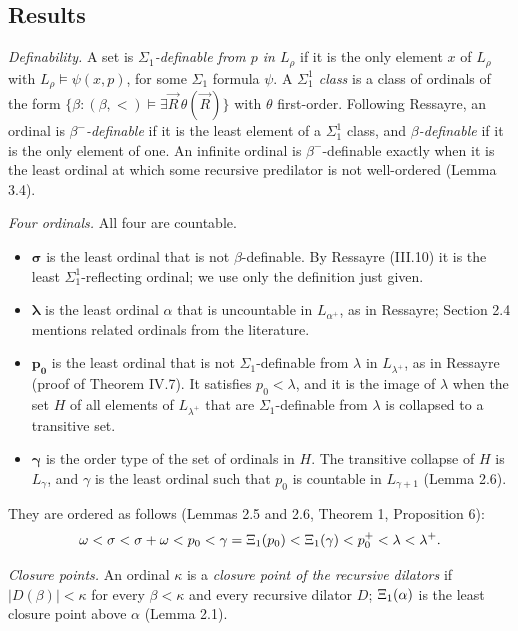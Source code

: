 \documentclass[11pt]{article}
\begin{document}
\subsection{Results}

\emph{Definability.} A set is \emph{$\Sigma_1$-definable from $p$ in $L_{\rho}$} if it is the only element $x$ of
$L_{\rho}$ with $L_{\rho} \models \psi(x, p)$, for some $\Sigma_1$ formula $\psi$. A \emph{$\Sigma^1_1$ class} is a
class of ordinals of the form $\{\beta : (\beta, <) \models \exists \vec R\, \theta(\vec R)\}$ with $\theta$
first-order. Following Ressayre, an ordinal is \emph{$\beta^-$-definable} if it is the least element of a
$\Sigma^1_1$ class, and \emph{$\beta$-definable} if it is the only element of one. An infinite ordinal is
$\beta^-$-definable exactly when it is the least ordinal at which some recursive predilator is not well-ordered
(Lemma 3.4).

\emph{Four ordinals.} All four are countable.
\begin{itemize}
\item $\boldsymbol{\sigma}$ is the least ordinal that is not $\beta$-definable. By Ressayre (III.10) it is the least
  $\Sigma^1_1$-reflecting ordinal; we use only the definition just given.
\item $\boldsymbol{\lambda}$ is the least ordinal $\alpha$ that is uncountable in $L_{\alpha^+}$, as in Ressayre;
  Section 2.4 mentions related ordinals from the literature.
\item $\boldsymbol{p_0}$ is the least ordinal that is not $\Sigma_1$-definable from $\lambda$ in $L_{\lambda^+}$, as in
  Ressayre (proof of Theorem IV.7). It satisfies $p_0 < \lambda$, and it is the image of $\lambda$ when the set $H$ of all elements of
  $L_{\lambda^+}$ that are $\Sigma_1$-definable from $\lambda$ is collapsed to a transitive set.
\item $\boldsymbol{\gamma}$ is the order type of the set of ordinals in $H$. The transitive collapse of $H$ is
  $L_{\gamma}$, and $\gamma$ is the least ordinal such that $p_0$ is countable in $L_{\gamma+1}$ (Lemma 2.6).
\end{itemize}
They are ordered as follows (Lemmas 2.5 and 2.6, Theorem 1, Proposition 6):
\[ \omega < \sigma < \sigma + \omega < p_0 < \gamma = \Xi_1(p_0) < \Xi_1(\gamma) < p_0^+ < \lambda < \lambda^+ . \]

\emph{Closure points.} An ordinal $\kappa$ is a \emph{closure point of the recursive dilators}
if $|D(\beta)| < \kappa$ for every $\beta < \kappa$ and every recursive dilator $D$; $\Xi_1(\alpha)$ is the least
closure point above $\alpha$ (Lemma 2.1).
\end{document}

